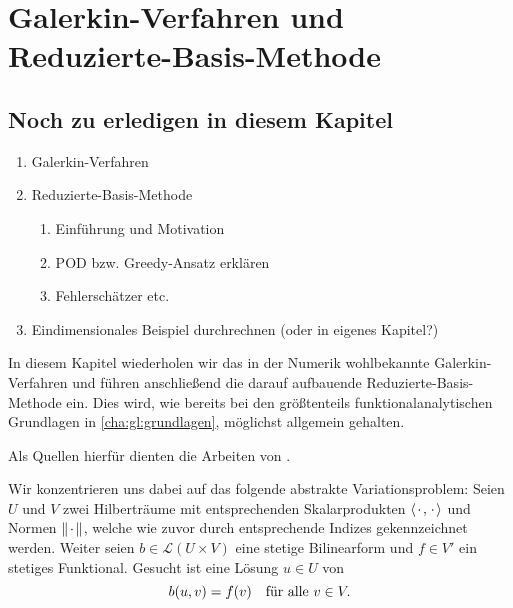 
\iftoggle{dictum}{
    \setchapterpreamble[ul][0.6\textwidth]{%
        \dictum[Alfréd Rényi]{\enquote{A mathematician is a device for turning coffee into theorems.}}
        \vspace*{2\baselineskip}
    }
}{}
\chapter{Galerkin-Verfahren und Reduzierte-Basis-Methode} %
\label{cha:grb:galerkin_und_reduzierte_basis}

\section*{Noch zu erledigen in diesem Kapitel} %

\begin{enumerate}
    \item Galerkin-Verfahren
    \item Reduzierte-Basis-Methode
    \begin{enumerate}
        \item Einführung und Motivation
        \item POD bzw. Greedy-Ansatz erklären
        \item Fehlerschätzer etc.
    \end{enumerate}
    \item Eindimensionales Beispiel durchrechnen (oder in eigenes Kapitel?)
\end{enumerate}


\clearpage

In diesem Kapitel wiederholen wir das in der Numerik wohlbekannte Galerkin-Verfahren und führen anschließend die darauf aufbauende Reduzierte-Basis-Methode ein.
Dies wird, wie bereits bei den größtenteils funktionalanalytischen Grundlagen in \cref{cha:gl:grundlagen}, möglichst allgemein gehalten.

Als Quellen hierfür dienten die Arbeiten von \textcite{Braess:2007wm,Patera:2007un,Quarteroni:2011jm}.

Wir konzentrieren uns dabei auf das folgende abstrakte Variationsproblem:
Seien $U$ und $V$ zwei Hilberträume mit entsprechenden Skalarprodukten $\left\langle{\mkern2mu\cdot\mkern2mu},{\mkern2mu\cdot\mkern2mu}\right\rangle$ und Normen $\lVert{\mkern2mu\cdot\mkern2mu}\rVert$, welche wie zuvor durch entsprechende Indizes gekennzeichnet werden.
Weiter seien $b \in \mathcal L(U \times V)$ eine stetige Bilinearform und $f \in V'$ ein stetiges Funktional.
Gesucht ist eine Lösung $u \in U$ von
\begin{equation}
\label{eq:grb:abstraktes_variationsproblem}
    b(u, v) = f(v) \quad \fa v \in V.
\end{equation}

